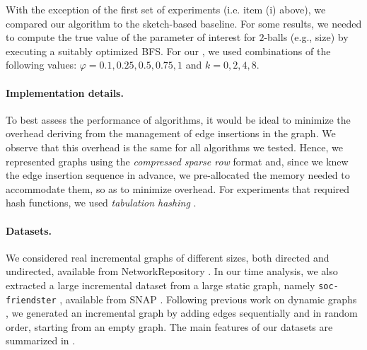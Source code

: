 With the exception of the first set of experiments (i.e. item (i) above), we compared our algorithm to the sketch-based baseline. For some results, we needed to compute the true value of the parameter of interest for $2$-balls (e.g., size) by executing a suitably optimized BFS. For our \lazyscheme, we used combinations of the following values: $\varphi =  0.1, 0.25, 0.5, 0.75, 1$ and $k = 0, 2, 4, 8$. 


\paragraph{Implementation details.}
To best assess the performance of algorithms, it would be ideal to minimize the overhead deriving from the management of edge insertions in the graph. We observe that this overhead is the same for all algorithms we tested. Hence, we represented graphs using the \textit{compressed sparse row}  format \cite{Eisenstat1982YaleSM} and, since we knew the edge insertion sequence in advance, we pre-allocated the memory needed to accommodate them, so as to minimize overhead.
For experiments that required hash functions, we used \textit{tabulation hashing} \cite{tabulation-hashing}.



\paragraph{Datasets.}
We considered real incremental graphs of different sizes, both directed and undirected, available from NetworkRepository \cite{networkrepository}. In our time analysis, we also extracted a large incremental dataset from a large static graph, namely \texttt{soc-friendster} \cite{soc-friendster}, available from SNAP \cite{snapnets}. Following previous work on dynamic graphs \cite{chen2022dynamictree, Hanauer22DynamicSurvey}, we generated an incremental graph by adding edges sequentially and in random order, starting from an empty graph. The main features of our datasets are summarized in .

